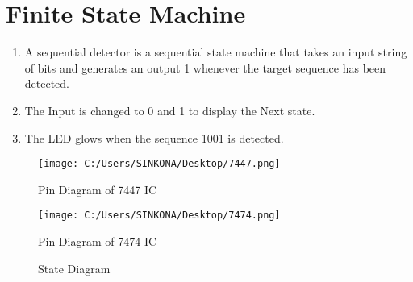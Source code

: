 \documentclass[journal,12pt,twocolumn]{IEEEtran}
\begin{document}
\section{Finite State Machine}
\begin{enumerate}
\item A sequential detector is a sequential state machine that takes an input string of bits and generates an output 1 whenever the target sequence has been detected.
\item The Input is changed to 0 and 1 to display the Next state.
\item The LED glows when the sequence 1001 is detected.
\end{enumerate} 


\begin{figure}[h!]
\centering
\texttt{[image: C:/Users/SINKONA/Desktop/7447.png]} 
\centering
\caption{Pin Diagram of 7447 IC}
\end{figure}

\begin{figure}[h!]
\centering
\texttt{[image: C:/Users/SINKONA/Desktop/7474.png]}
\centering
\caption{Pin Diagram of 7474 IC}
\end{figure}

\begin{figure}

\caption{State Diagram}
\end{figure}
\end{document}
